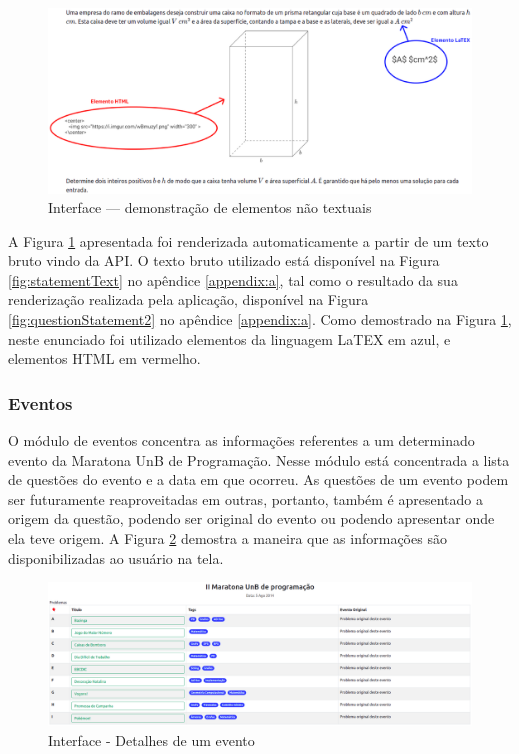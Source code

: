 \begin{figure}[H]
    \centering
    \includegraphics[keepaspectratio=true,scale=0.35]{figuras/questionStatement.eps}
    \caption{Interface — demonstração de elementos não textuais}
    \label{fig:questionStatement}
\end{figure}

A Figura \ref{fig:questionStatement} apresentada foi renderizada automaticamente a partir de um texto bruto vindo da API. O texto bruto utilizado está disponível na Figura \ref{fig:statementText} no apêndice \ref{appendix:a}, tal como o resultado da sua renderização realizada pela aplicação, disponível na Figura \ref{fig:questionStatement2} no apêndice \ref{appendix:a}. Como demostrado na Figura \ref{fig:questionStatement}, neste enunciado foi utilizado elementos da linguagem LaTEX em azul, e elementos HTML em vermelho.

\subsubsection{Eventos}
\label{subsec:eventos}

O módulo de eventos concentra as informações referentes a um determinado evento da Maratona UnB de Programação. Nesse módulo está concentrada a lista de questões do evento e a data em que ocorreu. As questões de um evento podem ser futuramente reaproveitadas em outras, portanto, também é apresentado a origem da questão, podendo ser original do evento ou podendo apresentar onde ela teve origem. A Figura \ref{fig:maratonaUnB} demostra a maneira que as informações são disponibilizadas ao usuário na tela.

\begin{figure}[H]
    \centering
    \includegraphics[keepaspectratio=true,scale=0.23]{figuras/contest2.eps}
    \caption{Interface - Detalhes de um evento}
    \label{fig:maratonaUnB}
\end{figure}


